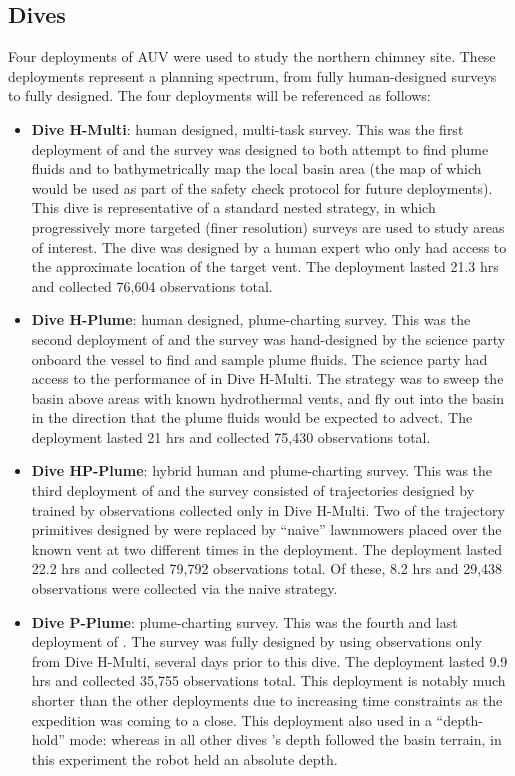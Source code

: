 \subsection{Dives}
\label{sec:field_dives}
Four deployments of AUV \Sentry were used to study the northern chimney site. These deployments represent a planning spectrum, from fully human-designed surveys to fully \PHORTEX designed. The four deployments will be referenced as follows:
\begin{itemize}
    \item \textbf{Dive H-Multi}: human designed, multi-task survey. This was the first deployment of \Sentry and the survey was designed to both attempt to find plume fluids and to bathymetrically map the local basin area (the map of which would be used as part of the safety check protocol for future deployments). This dive is representative of a standard nested strategy, in which progressively more targeted (finer resolution) surveys are used to study areas of interest. The dive was designed by a human expert who only had access to the approximate location of the target vent. The deployment lasted 21.3 hrs and collected 76,604 observations total.
    \item \textbf{Dive H-Plume}: human designed, plume-charting survey. This was the second deployment of \Sentry and the survey was hand-designed by the science party onboard the vessel to find and sample plume fluids. The science party had access to the performance of \Sentry in Dive H-Multi. The strategy was to sweep the basin above areas with known hydrothermal vents, and fly out into the basin in the direction that the plume fluids would be expected to advect. The deployment lasted 21 hrs and collected 75,430 observations total.
    \item \textbf{Dive HP-Plume}: hybrid human and \PHORTEX plume-charting survey. This was the third deployment of \Sentry and the survey consisted of trajectories designed by \PHORTEX trained by observations collected only in Dive H-Multi. Two of the trajectory primitives designed by \PHORTEX were replaced by ``naive'' lawnmowers placed over the known vent at two different times in the deployment. The deployment lasted 22.2 hrs and collected 79,792 observations total. Of these, 8.2 hrs and 29,438 observations were collected via the naive strategy.
    \item \textbf{Dive P-Plume}: \PHORTEX plume-charting survey. This was the fourth and last deployment of \Sentry. The survey was fully designed by \PHORTEX using observations only from Dive H-Multi, several days prior to this dive. The deployment lasted 9.9 hrs and collected 35,755 observations total. This deployment is notably much shorter than the other deployments due to increasing time constraints as the expedition was coming to a close. This deployment also used \Sentry in a ``depth-hold'' mode: whereas in all other dives \Sentry's depth followed the basin terrain, in this experiment the robot held an absolute depth.
\end{itemize}

